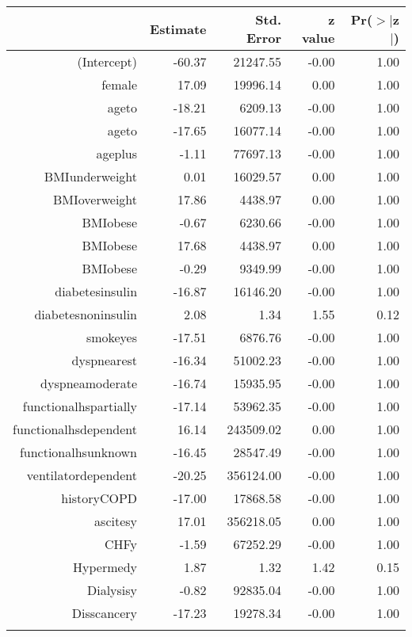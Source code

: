 \bigskip\bigskip
\centering
\begin{tabular}{rrrrr}
  \hline
 & Estimate & Std. Error & z value & Pr($>$$|$z$|$) \\ 
  \hline
(Intercept) & -60.37 & 21247.55 & -0.00 & 1.00 \\ 
  female & 17.09 & 19996.14 & 0.00 & 1.00 \\ 
  age\-65\-to\-74 & -18.21 & 6209.13 & -0.00 & 1.00 \\ 
  age\-75\-to\-84 & -17.65 & 16077.14 & -0.00 & 1.00 \\ 
  age\-85\-plus & -1.11 & 77697.13 & -0.00 & 1.00 \\ 
  BMI\-underweight & 0.01 & 16029.57 & 0.00 & 1.00 \\ 
  BMI\-overweight & 17.86 & 4438.97 & 0.00 & 1.00 \\ 
  BMI\-obese\-1 & -0.67 & 6230.66 & -0.00 & 1.00 \\ 
  BMI\-obese\-2 & 17.68 & 4438.97 & 0.00 & 1.00 \\ 
  BMI\-obese\-3 & -0.29 & 9349.99 & -0.00 & 1.00 \\ 
  diabetes\-insulin & -16.87 & 16146.20 & -0.00 & 1.00 \\ 
  diabetes\-noninsulin & 2.08 & 1.34 & 1.55 & 0.12 \\ 
  smoke\-yes & -17.51 & 6876.76 & -0.00 & 1.00 \\ 
  dyspnea\-rest & -16.34 & 51002.23 & -0.00 & 1.00 \\ 
  dyspnea\-moderate & -16.74 & 15935.95 & -0.00 & 1.00 \\ 
  functional\-hs\-partially & -17.14 & 53962.35 & -0.00 & 1.00 \\ 
  functional\-hs\-dependent & 16.14 & 243509.02 & 0.00 & 1.00 \\ 
  functional\-hs\-unknown & -16.45 & 28547.49 & -0.00 & 1.00 \\ 
  ventilator\-dependent & -20.25 & 356124.00 & -0.00 & 1.00 \\ 
  history\-COPD & -17.00 & 17868.58 & -0.00 & 1.00 \\ 
  ascites\-y & 17.01 & 356218.05 & 0.00 & 1.00 \\ 
  CHF\-y & -1.59 & 67252.29 & -0.00 & 1.00 \\ 
  Hyper\-med\-y & 1.87 & 1.32 & 1.42 & 0.15 \\ 
  Dialysis\-y & -0.82 & 92835.04 & -0.00 & 1.00 \\ 
  Diss\-cancer\-y & -17.23 & 19278.34 & -0.00 & 1.00 \\ 
$$
\end{tabular}
